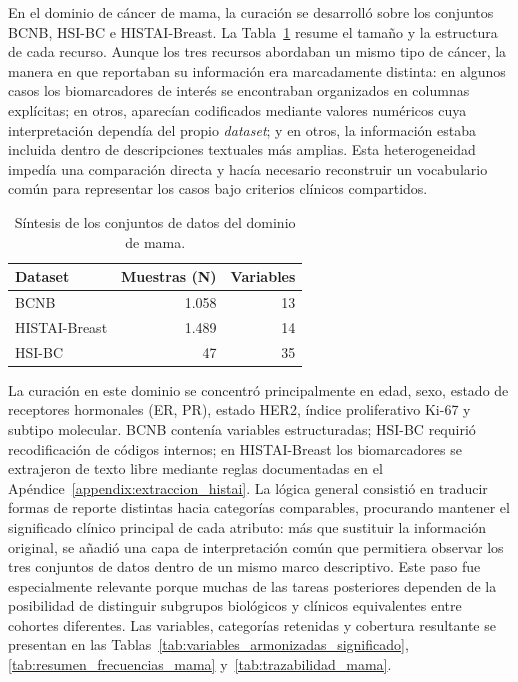 En el dominio de cáncer de mama, la curación se desarrolló sobre los conjuntos BCNB, HSI-BC e HISTAI-Breast. La Tabla~\ref{tab:resumen_mama} resume el tamaño y la estructura de cada recurso. Aunque los tres recursos abordaban un mismo tipo de cáncer, la manera en que reportaban su información era marcadamente distinta: en algunos casos los biomarcadores de interés se encontraban organizados en columnas explícitas; en otros, aparecían codificados mediante valores numéricos cuya interpretación dependía del propio \textit{dataset}; y en otros, la información estaba incluida dentro de descripciones textuales más amplias. Esta heterogeneidad impedía una comparación directa y hacía necesario reconstruir un vocabulario común para representar los casos bajo criterios clínicos compartidos.

\begin{table}[htbp]
\centering
\caption{Síntesis de los conjuntos de datos del dominio de mama.}
\label{tab:resumen_mama}
\small
\begin{tabular}{lrr}
\toprule
\textbf{Dataset} & \textbf{Muestras (N)} & \textbf{Variables} \\
\midrule
BCNB & 1.058 & 13 \\
HISTAI-Breast & 1.489 & 14 \\
HSI-BC & 47 & 35 \\
\bottomrule
\end{tabular}
\end{table}

La curación en este dominio se concentró principalmente en edad, sexo, estado de receptores hormonales (ER, PR), estado HER2, índice proliferativo Ki-67 y subtipo molecular. BCNB contenía variables estructuradas; HSI-BC requirió recodificación de códigos internos; en HISTAI-Breast los biomarcadores se extrajeron de texto libre mediante reglas documentadas en el Apéndice~\ref{appendix:extraccion_histai}. La lógica general consistió en traducir formas de reporte distintas hacia categorías comparables, procurando mantener el significado clínico principal de cada atributo: más que sustituir la información original, se añadió una capa de interpretación común que permitiera observar los tres conjuntos de datos dentro de un mismo marco descriptivo. Este paso fue especialmente relevante porque muchas de las tareas posteriores dependen de la posibilidad de distinguir subgrupos biológicos y clínicos equivalentes entre cohortes diferentes. Las variables, categorías retenidas y cobertura resultante se presentan en las Tablas~\ref{tab:variables_armonizadas_significado}, \ref{tab:resumen_frecuencias_mama} y~\ref{tab:trazabilidad_mama}.

